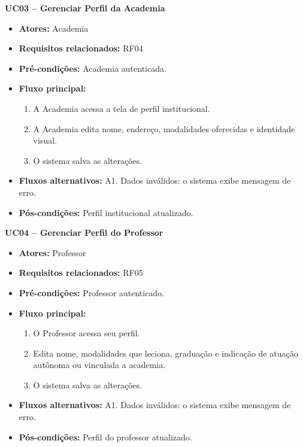 \noindent\textbf{UC03 -- Gerenciar Perfil da Academia}
\begin{itemize}[leftmargin=*, itemsep=0pt, topsep=2pt]
  \item \textbf{Atores:} Academia
  \item \textbf{Requisitos relacionados:} RF04
  \item \textbf{Pré-condições:} Academia autenticada.
  \item \textbf{Fluxo principal:}
  \begin{enumerate}[label=\arabic*., itemsep=0pt, topsep=0pt]
    \item A Academia acessa a tela de perfil institucional.
    \item A Academia edita nome, endereço, modalidades oferecidas e identidade visual.
    \item O sistema salva as alterações.
  \end{enumerate}
  \item \textbf{Fluxos alternativos:} A1. Dados inválidos: o sistema exibe mensagem de erro.
  \item \textbf{Pós-condições:} Perfil institucional atualizado.
\end{itemize}
\medskip

\noindent\textbf{UC04 -- Gerenciar Perfil do Professor}
\begin{itemize}[leftmargin=*, itemsep=0pt, topsep=2pt]
  \item \textbf{Atores:} Professor
  \item \textbf{Requisitos relacionados:} RF05
  \item \textbf{Pré-condições:} Professor autenticado.
  \item \textbf{Fluxo principal:}
  \begin{enumerate}[label=\arabic*., itemsep=0pt, topsep=0pt]
    \item O Professor acessa seu perfil.
    \item Edita nome, modalidades que leciona, graduação e indicação de atuação autônoma ou vinculada a academia.
    \item O sistema salva as alterações.
  \end{enumerate}
  \item \textbf{Fluxos alternativos:} A1. Dados inválidos: o sistema exibe mensagem de erro.
  \item \textbf{Pós-condições:} Perfil do professor atualizado.
\end{itemize}
\medskip

